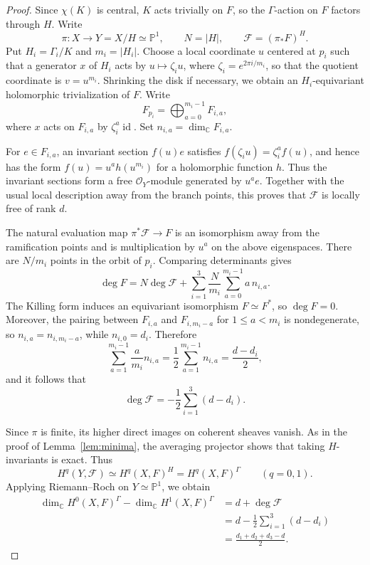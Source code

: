 \documentclass[11pt,a4paper,reqno]{amsart}
\theoremstyle{plain}
\theoremstyle{definition}
\theoremstyle{remark}
\numberwithin{equation}{section}
\newcommand{\CC}{\mathbb C}
\newcommand{\PP}{\mathbb P}
\newcommand{\cO}{\mathcal O}
\DeclareMathOperator{\id}{id}
\begin{document}
\begin{proof}
Since $\chi(K)$ is central, $K$ acts trivially on $F$, so the $\Gamma$-action on $F$ factors through $H$. Write
\[
\pi\colon X\longrightarrow Y=X/H\simeq\PP^1,\qquad N=|H|,\qquad \mathcal F=(\pi_*F)^H.
\]
Put $H_i=\Gamma_i/K$ and $m_i=|H_i|$. Choose a local coordinate $u$ centered at $p_i$ such that a generator $x$ of $H_i$ acts by $u\mapsto\zeta_i u$, where $\zeta_i=e^{2\pi i/m_i}$, so that the quotient coordinate is $v=u^{m_i}$. Shrinking the disk if necessary, we obtain an $H_i$-equivariant holomorphic trivialization of $F$. Write
\[
F_{p_i}=\bigoplus_{a=0}^{m_i-1}F_{i,a},
\]
where $x$ acts on $F_{i,a}$ by $\zeta_i^a\id$. Set $n_{i,a}=\dim_{\CC}F_{i,a}$.

For $e\in F_{i,a}$, an invariant section $f(u)e$ satisfies $f(\zeta_i u)=\zeta_i^a f(u)$, and hence has the form $f(u)=u^a h(u^{m_i})$ for a holomorphic function $h$. Thus the invariant sections form a free $\cO_Y$-module generated by $u^a e$. Together with the usual local description away from the branch points, this proves that $\mathcal F$ is locally free of rank $d$.

The natural evaluation map $\pi^*\mathcal F\longrightarrow F$ is an isomorphism away from the ramification points and is multiplication by $u^a$ on the above eigenspaces. There are $N/m_i$ points in the orbit of $p_i$. Comparing determinants gives
\[
\deg F=N\deg\mathcal F+\sum_{i=1}^3\frac{N}{m_i}\sum_{a=0}^{m_i-1}a\,n_{i,a}.
\]
The Killing form induces an equivariant isomorphism $F\simeq F^*$, so $\deg F=0$. Moreover, the pairing between $F_{i,a}$ and $F_{i,m_i-a}$ for $1\le a<m_i$ is nondegenerate, so $n_{i,a}=n_{i,m_i-a}$, while $n_{i,0}=d_i$. Therefore
\[
\sum_{a=1}^{m_i-1}\frac{a}{m_i}n_{i,a}=\frac{1}{2}\sum_{a=1}^{m_i-1}n_{i,a}=\frac{d-d_i}{2},
\]
and it follows that
\[
\deg\mathcal F=-\frac12\sum_{i=1}^3(d-d_i).
\]

Since $\pi$ is finite, its higher direct images on coherent sheaves vanish. As in the proof of Lemma~\ref{lem:minima}, the averaging projector shows that taking $H$-invariants is exact. Thus
\[
H^q(Y,\mathcal F)\simeq H^q(X,F)^H=H^q(X,F)^\Gamma\qquad(q=0,1).
\]
Applying Riemann--Roch on $Y\simeq\PP^1$, we obtain
\[
\begin{aligned}\dim_{\CC}H^0(X,F)^\Gamma-\dim_{\CC}H^1(X,F)^\Gamma&=d+\deg\mathcal F\\
&=d-\frac12\sum_{i=1}^3(d-d_i)\\
&=\frac{d_1+d_2+d_3-d}{2}.
\end{aligned}
\]
\end{proof}
\end{document}
